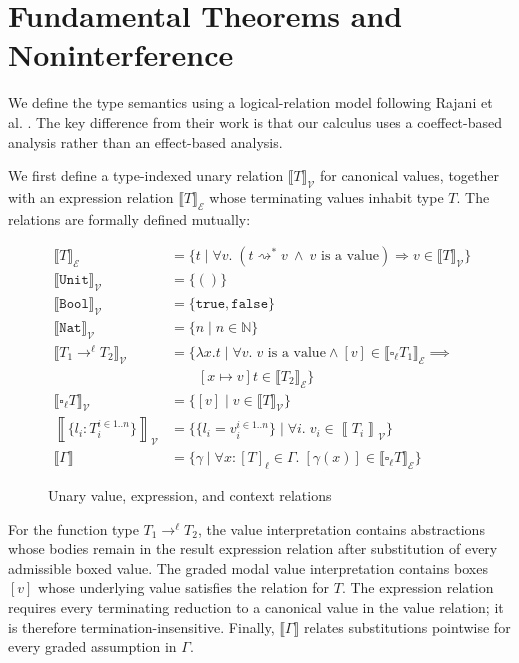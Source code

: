 \documentclass[conference]{IEEEtran}
\newcommand\gradedt[2]{\square_{#1} #2}
\newcommand\true{\texttt{true}}
\newcommand\false{\texttt{false}}
\newcommand\bool{\texttt{Bool}}
\newcommand\nat{\texttt{Nat}}
\newcommand\unt{()}
\newcommand\untt{\texttt{Unit}}
\newcommand\calv{\mathcal{V}}
\newcommand\cale{\mathcal{E}}
\newcommand\bbrac[1]{\left\llbracket #1\right\rrbracket}
\begin{document}
\section{Fundamental Theorems and Noninterference}

We define the type semantics using a logical-relation model following Rajani et al. \cite{rajani2018types}. The key difference from their work is that our calculus uses a coeffect-based analysis rather than an effect-based analysis.

We first define a type-indexed unary relation $\llbracket T\rrbracket_\calv$ for canonical values, together with an expression relation $\llbracket T\rrbracket_\cale$ whose terminating values inhabit type $T$. The relations are formally defined mutually:

\begin{figure}[H]
	\centering
	$$
	\begin{aligned}
		\llbracket T\rrbracket_\cale &= \{t\mid \forall v.\;(t\rightsquigarrow^* v\ \wedge\ v\text{ is a value})\Rightarrow v\in\llbracket T\rrbracket_\calv\}\\
		\llbracket\untt\rrbracket_\calv &= \{ \unt \} \\
		\llbracket\bool\rrbracket_\calv &= \{\true, \false\} \\
		\llbracket\nat\rrbracket_\calv &= \{n \mid n \in \mathbb{N}\} \\
		\llbracket T_1\to^\ell T_2 \rrbracket_\calv &= \{\lambda x.t \mid \forall v.\;v\text{ is a value}\wedge[v]\in\llbracket\gradedt{\ell}{T_1}\rrbracket_\cale\implies\\ &\qquad[x\mapsto v]t\in\llbracket T_2\rrbracket_\cale\} \\
		\llbracket\gradedt{\ell}{T}\rrbracket_\calv &= \{[v] \mid v\in\llbracket T\rrbracket_\calv\}\\
		\bbrac{\{l_i:T_i^{i\in 1..n}\}}_\calv &= \{\{l_i=v_i^{i\in 1..n}\}\mid\forall i.\;v_i\in\bbrac{T_i}_\calv\}\\
		\llbracket\Gamma\rrbracket&=\{\gamma\mid\forall x:[T]_\ell\in\Gamma.\;[\gamma(x)]\in\llbracket\gradedt{\ell}{T}\rrbracket_\cale\}
	\end{aligned}
	$$
	\caption{Unary value, expression, and context relations}
\end{figure}

For the function type $T_1\to^\ell T_2$, the value interpretation contains abstractions whose bodies remain in the result expression relation after substitution of every admissible boxed value. The graded modal value interpretation contains boxes $[v]$ whose underlying value satisfies the relation for $T$. The expression relation requires every terminating reduction to a canonical value in the value relation; it is therefore termination-insensitive. Finally, $\llbracket\Gamma\rrbracket$ relates substitutions pointwise for every graded assumption in $\Gamma$.
\end{document}
